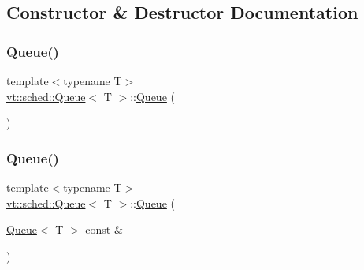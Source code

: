 \subsection{Constructor \& Destructor Documentation}
\mbox{\label{structvt_1_1sched_1_1_queue_a5bca57d5a8c3bb7bfb30ed1bc634c29f}} 
\subsubsection{\texorpdfstring{Queue()}{Queue()}\hspace{0.1cm}{\footnotesize\ttfamily [1/3]}}
{\footnotesize\ttfamily template$<$typename T$>$ \\
\hyperlink{structvt_1_1sched_1_1_queue}{vt\+::sched\+::\+Queue}$<$ T $>$\+::\hyperlink{structvt_1_1sched_1_1_queue}{Queue} (\begin{DoxyParamCaption}{ }\end{DoxyParamCaption})\hspace{0.3cm}{\ttfamily [default]}}

\mbox{\label{structvt_1_1sched_1_1_queue_a718cecfdd0b3fa8ec80fe4768e153467}} 
\subsubsection{\texorpdfstring{Queue()}{Queue()}\hspace{0.1cm}{\footnotesize\ttfamily [2/3]}}
{\footnotesize\ttfamily template$<$typename T$>$ \\
\hyperlink{structvt_1_1sched_1_1_queue}{vt\+::sched\+::\+Queue}$<$ T $>$\+::\hyperlink{structvt_1_1sched_1_1_queue}{Queue} (\begin{DoxyParamCaption}\item[{\hyperlink{structvt_1_1sched_1_1_queue}{Queue}$<$ T $>$ const \&}]{ }\end{DoxyParamCaption})\hspace{0.3cm}{\ttfamily [default]}}

\mbox{\label{structvt_1_1sched_1_1_queue_a0a85a456ebc179a2f7ab77369566eb5c}} 
